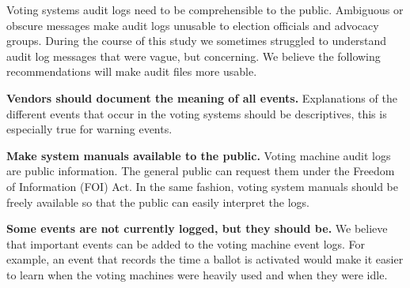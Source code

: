 Voting systems audit logs need to be comprehensible to the public. Ambiguous or
obscure messages make audit 
logs unusable to election officials and advocacy groups. During the course of
this study we sometimes struggled to understand audit log messages that were
vague, but concerning. We believe the following recommendations
will make audit files more usable.


\textbf{Vendors should document the meaning of all events.} Explanations of the
different events that occur in the voting systems should be descriptives, this
is especially true for warning events.

\begin{comment}
\textbf{Accuracy of date and time logging needs improvement.} Some voting
systems allow for system settings to be adjusted by election workers and
therefore are prone to human error. Time and date setting is one of the voting
machine parameters that is usually adjusted manually at election central in
preparation for precinct deployment. When the time of the machine setting is
incorrect, it becomes difficult to recreate election day events. Audit logs are
ground truth for election disputes; their accuracy is key. 
\end{comment}

\textbf{Make system manuals available to the public.} Voting machine audit logs
are public information. The general public can request them under the Freedom of
Information (FOI) Act. In the same fashion, voting system manuals should be
freely available so that the public can easily interpret the logs. 

\textbf{Some events are not currently logged, but they should be.} We believe
that important events can be added to the voting machine event logs. For
example, an event that records the time a ballot is activated would make it
easier to learn when the voting machines were heavily used and when they were idle.


